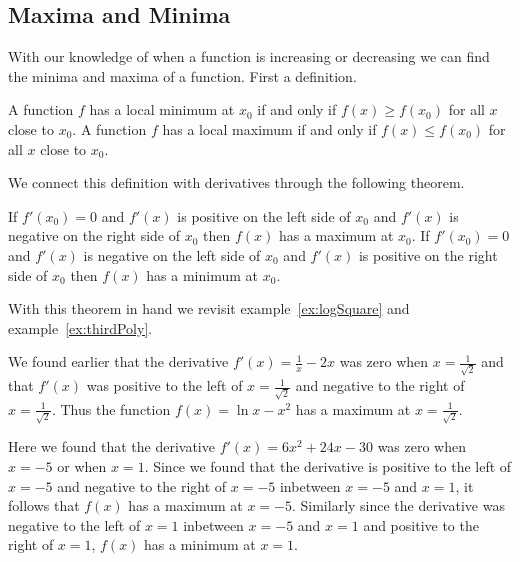 \documentclass[main.tex]{subfiles}
\begin{document}
\subsection{Maxima and Minima}
With our knowledge of when a function is increasing or decreasing we can find the minima and maxima of a function. First a definition.
\begin{definition}
A function $f$ has a local minimum at $x_0$ if and only if $f(x) \geq f(x_0)$ for all $x$ close to $x_0$. A function $f$ has a local maximum if and only if $f(x) \leq f(x_0)$ for all $x$ close to $x_0$.
\end{definition}
We connect this definition with derivatives through the following theorem.
\begin{theorem}
If $f'(x_0) = 0$ and $f'(x)$ is positive on the left side of $x_0$ and $f'(x)$ is negative on the right side of $x_0$ then $f(x)$ has a maximum at $x_0$. If $f'(x_0) = 0$ and $f'(x)$ is negative on the left side of $x_0$ and $f'(x)$ is positive on the right side of $x_0$ then $f(x)$ has a minimum at $x_0$.
\end{theorem}
With this theorem in hand we revisit example~\ref{ex:logSquare} and example~\ref{ex:thirdPoly}.
\begin{example}[continues=ex:logSquare]
We found earlier that the derivative $f'(x) = \frac{1}{x} - 2 x$ was zero when $x = \frac{1}{\sqrt{2}}$ and that $f'(x)$ was positive to the left of $x = \frac{1}{\sqrt{2}}$ and negative to the right of $x = \frac{1}{\sqrt{2}}$. Thus the function $f(x) = \ln x - x^2$ has a maximum at $x = \frac{1}{\sqrt{2}}$.
\end{example}
\begin{example}[continues=ex:thirdPoly]
Here we found that the derivative $f'(x) = 6 x^2 + 24 x - 30$  was zero when $x = -5$ or when $x = 1$. Since we found that the derivative is positive to the left of $x = -5$ and negative to the right of $x = -5$ inbetween $x = -5$ and $x = 1$, it follows that $f(x)$ has a maximum at $x = -5$. Similarly since the derivative was negative to the left of $x = 1$ inbetween $x = -5$ and $x = 1$ and positive to the right of $x = 1$, $f(x)$ has a minimum at $x = 1$.
\end{example}
\end{document}
